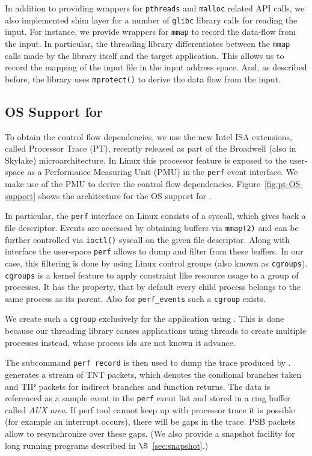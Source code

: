  In addition to providing wrappers for {\tt pthreads} and {\tt malloc} related API calls, we also implemented shim layer for a number of {\tt glibc} library calls for reading the input. For instance, we provide wrappers for {\tt mmap} to record the data-flow from the input. In particular, the threading library differentiates between the {\tt mmap} calls made by the library itself and the target application. This allows us to record the mapping of the input file in the input address space. And, as described before, the library uses {\tt mprotect()} to derive the data flow from the input. 


\subsection{OS Support for \intelpt}

To obtain the control flow dependencies, we use the new Intel ISA extensions, called Processor Trace (PT), recently released as part of the Broadwell (also in Skylake) microarchitecture. In Linux this processor feature is exposed to the user-space as a Performance Measuring Unit (PMU) in the {\tt perf} event interface. We make use of the \intelpt PMU to derive the control flow dependencies. Figure~\ref{fig:pt-OS-support} shows the architecture for the OS support for \intelpt.

 

In particular, the {\tt perf} interface on Linux consists of a syscall, which gives back a file
descriptor. Events are accessed by obtaining buffers via {\tt mmap(2)} and can be
further controlled via {\tt ioctl()} syscall on the given file descriptor. Along with
interface the user-space {\tt perf} allows to dump and filter from these
buffers. In our case, this filtering is done by using Linux control
groups (also known as {\tt cgroups}). {\tt cgroups} is a kernel feature to apply constraint
like resource usage to a group of processes. It has the property, that by
default every child process belongs to the same process as its parent. Also for
{\tt perf\_events} such a {\tt cgroup} exists.

We create such a {\tt cgroup} exclusively for the application using \projecttitle. This is done because
our threading library causes applications using threads to create multiple
processes instead, whose process ids are not known it advance.

The subcommand {\tt perf record} is then used to dump the trace produced by \intelpt.
\intelpt generates a stream of TNT packets, which denotes the
condional branches taken and TIP packets for indirect branches and function
returns. The data is referenced as a sample event in the {\tt perf} event list and
stored in a ring buffer called \emph{AUX area}. If perf tool cannot
keep up with processor trace it is possible (for example an interrupt occurs),
there will be gaps in the trace. PSB packets allow to resynchronize over these
gaps. (We also provide a snapshot facility for long running programs described in $\S$~\ref{sec:snapshot}.)


